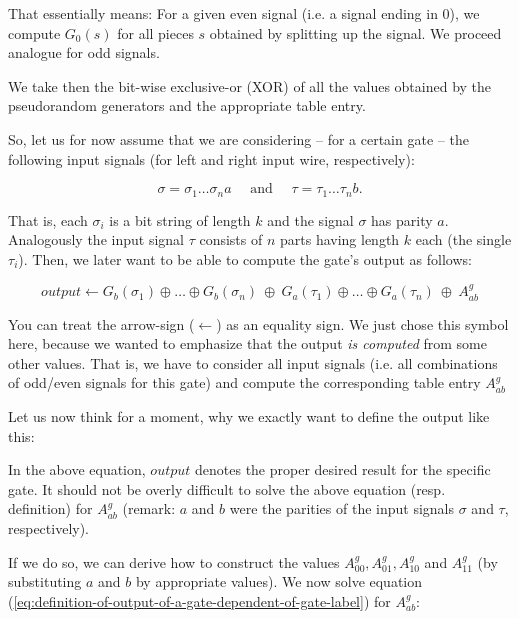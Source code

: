 That essentially means: For a given even signal (i.e. a signal ending in 0), we compute $G_0(s)$ for all pieces $s$ obtained by splitting up the signal. We proceed analogue for odd signals.

We take then the bit-wise exclusive-or (XOR) of all the values obtained by the pseudorandom generators and the appropriate table entry.

So, let us for now assume that we are considering -- for a certain gate -- the following input signals (for left and right input wire, respectively):

\begin{equation*}
  \sigma=\sigma_1\dots\sigma_na  \quad \text{ and }\quad \tau=\tau_1\dots\tau_nb.
\end{equation*}

That is, each $\sigma_i$ is a bit string of length $k$ and the signal $\sigma$ has parity $a$. Analogously the input signal $\tau$ consists of $n$ parts having length $k$ each (the single $\tau_i$). Then, we later want to be able to compute the gate's output as follows:

\begin{equation}
\label{eq:definition-of-output-of-a-gate-dependent-of-gate-label}
  output \gets G_b(\sigma_1)\oplus\dots\oplus G_b(\sigma_n) \ \oplus \ G_a(\tau_1)\oplus\dots\oplus G_a(\tau_n) \ \oplus \ A_{ab}^g
\end{equation}

You can treat the arrow-sign ($\gets$) as an equality sign. We just chose this symbol here, because we wanted to emphasize that the output \emph{is computed} from some other values. That is, we have to consider all input signals (i.e. all combinations of odd/even signals for this gate) and compute the corresponding table entry $A_{ab}^g$

Let us now think for a moment, why we exactly want to define the output like this: 

In the above equation, $output$ denotes the proper desired result for the specific gate. It should not be overly difficult to solve the above equation (resp. definition) for $A_{ab}^g$ (remark: $a$ and $b$ were the parities of the input signals $\sigma$ and $\tau$, respectively). 

If we do so, we can derive how to construct the values $A_{00}^g,A_{01}^g,A_{10}^g$ and $A_{11}^g$ (by substituting $a$ and $b$ by appropriate values). We now solve equation (\ref{eq:definition-of-output-of-a-gate-dependent-of-gate-label}) for $A_{ab}^g$:

